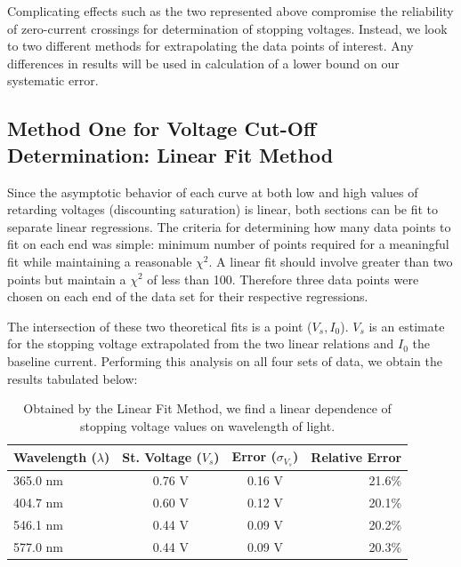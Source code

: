 \documentclass[aps,twocolumn,secnumarabic,nobalancelastpage,amsmath,amssymb,
nofootinbib]{revtex4}
\begin{document}
Complicating effects such as the two represented above compromise the reliability of zero-current crossings for determination of stopping voltages.  Instead, we look to two different methods for extrapolating the data points of interest.  Any differences in results will be used in calculation of a lower bound on our systematic error.


\subsection{Method One for Voltage Cut-Off Determination: Linear Fit Method}



Since the asymptotic behavior of each curve at both low and high values of retarding voltages (discounting saturation) is linear, both sections can be fit to separate linear regressions.  The criteria for determining how many data points to fit on each end was simple: minimum number of points required for a meaningful fit while maintaining a reasonable $\chi^2$.  A linear fit should involve greater than two points but maintain a $\chi^2$ of less than 100.  Therefore three data points were chosen on each end of the data set for their respective regressions.

The intersection of these two theoretical fits is a point ($V_s,I_0$).  $V_s$ is an estimate for the stopping voltage extrapolated from the two linear relations and $I_0$ the baseline current.  Performing this analysis on all four sets of data, we obtain the results tabulated below:



\begin{center}
\begin{table}[htbp]
\begin{tabular}{|l|c|c|r|}
\hline
{\small Wavelength ($\lambda$)} & {\small St. Voltage ($V_s$)} & {\small Error ($\sigma_{V_s}$)} & {\small Relative Error} \\
\hline
365.0 nm & 0.76 V & 0.16 V & 21.6\% \\
404.7 nm & 0.60 V & 0.12 V & 20.1\% \\
546.1 nm & 0.44 V & 0.09 V & 20.2\% \\
577.0 nm & 0.44 V & 0.09 V & 20.3\% \\
\hline
\end{tabular}
\caption{\label{tab:linfitresults} Obtained by the Linear Fit Method, we find a linear dependence of stopping voltage values on wavelength of light.}
\end{table}
\end{center}
\end{document}
